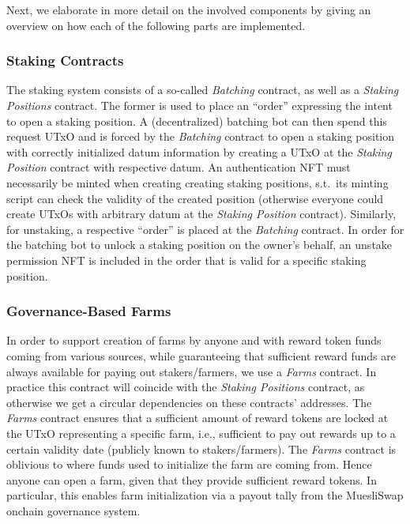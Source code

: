 \documentclass[12pt,parskip=full, tikz]{article}
\begin{document}
Next, we elaborate in more detail on the involved components by giving an overview on how each of the following parts are implemented.

\subsubsection{Staking Contracts}
The staking system consists of a so-called \emph{Batching} contract, as well as a \emph{Staking Positions} contract. The former is used to place an ``order'' expressing the intent to open a staking position. A (decentralized) batching bot can then spend this request UTxO and is forced by the \emph{Batching} contract to open a staking position with correctly initialized datum information by creating a UTxO at the \emph{Staking Position} contract with respective datum. An authentication NFT must necessarily be minted when creating creating staking positions, s.t.\ its minting script can check the validity of the created position (otherwise everyone could create UTxOs with arbitrary datum at the \emph{Staking Position} contract). Similarly, for unstaking, a respective ``order'' is placed at the \emph{Batching} contract. In order for the batching bot to unlock a staking position on the owner's behalf, an unstake permission NFT is included in the order that is valid for a specific staking position.

\subsubsection{Governance-Based Farms}
In order to support creation of farms by anyone and with reward token funds coming from various sources, while guaranteeing that sufficient reward funds are always available for paying out stakers/farmers, we use a \emph{Farms} contract. In practice this contract will coincide with the \emph{Staking Positions} contract, as otherwise we get a circular dependencies on these contracts' addresses. The \emph{Farms} contract ensures that a sufficient amount of reward tokens are locked at the UTxO representing a specific farm, i.e., sufficient to pay out rewards up to a certain validity date (publicly known to stakers/farmers). The \emph{Farms} contract is oblivious to where funds used to initialize the farm are coming from. Hence anyone can open a farm, given that they provide sufficient reward tokens. In particular, this enables farm initialization via a payout tally from the MuesliSwap onchain governance system.
\end{document}
